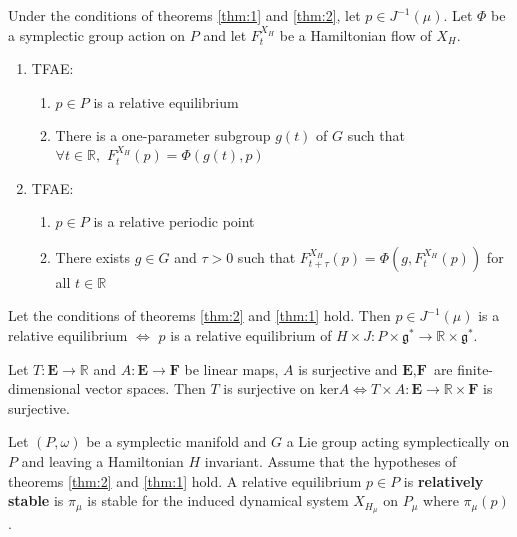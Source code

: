 \begin{prop}

Under the conditions of theorems \ref{thm:1} and \ref{thm:2}, let $p \in J^{-1}(\mu)$. Let $\Phi$ be a symplectic group action on $P$ and let $F^{X_H}_t$ be a Hamiltonian flow of $X_H$. 
\begin{enumerate}
    \item TFAE:
    \begin{enumerate}
        \item $p\in P$ is a relative equilibrium
        \item There is a one-parameter subgroup $g(t)$ of $G$ such that $\forall t \in \mathbb{R}, \hspace{4pt} F^{X_H}_t (p) = \Phi(g(t),p)$
    \end{enumerate}
    \item TFAE: 
    \begin{enumerate}
        \item $p \in P$ is a relative periodic point
        \item There exists $g \in G$ and $\tau > 0$ such that $F^{X_H}_{t+\tau} (p) = \Phi(g,F^{X_H}_t (p))$ for all $t \in \mathbb{R}$
    \end{enumerate}
\end{enumerate}

\end{prop}

\begin{prop}
Let the conditions of theorems \ref{thm:2} and \ref{thm:1} hold. Then $p \in J^{-1}(\mu)$ is a relative equilibrium $\iff$ $p$ is a relative equilibrium of $H \times J : P \times \mathfrak{g}^* \to \mathbb{R} \times \mathfrak{g}^*$.
\end{prop}

\begin{lem}

Let $T: \textbf{E} \to \mathbb{R}$ and $A: \textbf{E} \to \textbf{F}$ be linear maps, $A$ is surjective and $\textbf{E}, \textbf{F}$ are finite-dimensional vector spaces. Then $T$ is surjective on $\mathrm{ker}A \iff T \times A: \textbf{E} \to \mathbb{R} \times \textbf{F}$ is surjective.
\end{lem}

\begin{defn}
Let $(P, \omega)$ be a symplectic manifold and $G$ a Lie group acting symplectically on $P$ and leaving a Hamiltonian $H$ invariant. Assume that the hypotheses of theorems \ref{thm:2} and \ref{thm:1} hold. A relative equilibrium $p \in P$ is \textbf{relatively stable} is $\pi_{\mu}$ is stable for the induced dynamical system $X_{H_{\mu}}$ on $P_{\mu}$ where $\pi_{\mu}(p)$.
\end{defn}


